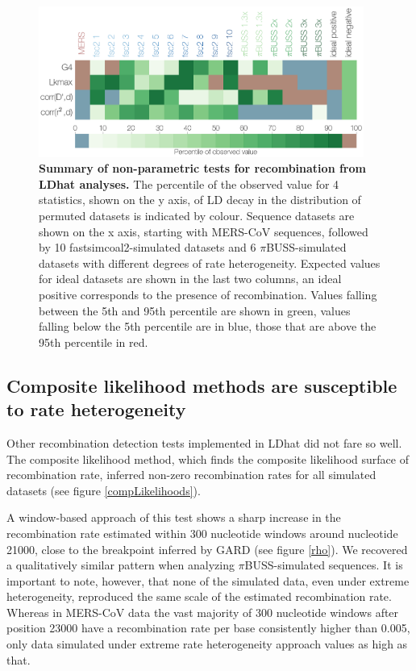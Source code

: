 \documentclass[11pt,oneside,letterpaper]{article}
\begin{document}
\begin{figure}[h]
	\centering
	\includegraphics[width=0.95\textwidth]{figures/MERS_LDhat_permutations_summary.png}
	\caption{\textbf{Summary of non-parametric tests for recombination from LDhat analyses.}
The percentile of the observed value for 4 statistics, shown on the y axis, of LD decay in the distribution of permuted datasets is indicated by colour.
Sequence datasets are shown on the x axis, starting with MERS-CoV sequences, followed by 10 fastsimcoal2-simulated datasets and 6 $\pi$BUSS-simulated datasets with different degrees of rate heterogeneity.
Expected values for ideal datasets are shown in the last two columns, an ideal positive corresponds to the presence of recombination.
Values falling between the 5th and 95th percentile are shown in green, values falling below the 5th percentile are in blue, those that are above the 95th percentile in red.}
	\label{permutations}
\end{figure}

\subsection*{Composite likelihood methods are susceptible to rate heterogeneity}
Other recombination detection tests implemented in LDhat did not fare so well.
The composite likelihood method, which finds the composite likelihood surface of recombination rate, inferred non-zero recombination rates for all simulated datasets (see figure \ref{compLikelihoods}).

A window-based approach of this test shows a sharp increase in the recombination rate estimated within 300 nucleotide windows around nucleotide 21000, close to the breakpoint inferred by GARD (see figure \ref{rho}).
We recovered a qualitatively similar pattern when analyzing $\pi$BUSS-simulated sequences.
It is important to note, however, that none of the simulated data, even under extreme heterogeneity, reproduced the same scale of the estimated recombination rate.
Whereas in MERS-CoV data the vast majority of 300 nucleotide windows after position 23000 have a recombination rate per base consistently higher than 0.005, only data simulated under extreme rate heterogeneity approach values as high as that.
\end{document}
